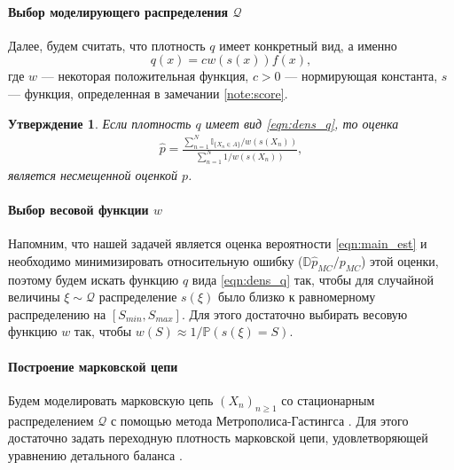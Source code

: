 \documentclass{spisok-article}
\newtheorem{utv}{Утверждение}
\begin{document}
\paragraph{Выбор моделирующего распределения $\mathcal{Q}$}
Далее, будем считать, что плотность $q$ имеет конкретный вид, а именно
\begin{equation}
\label{eqn:dens_q}
q(x) = c w(s(x))f(x),
\end{equation} где $w$ --- некоторая положительная функция, $c > 0$ --- нормирующая константа, $s$ --- функция, определенная в замечании \eqref{note:score}.
\begin{utv}
Если плотность $q$  имеет вид \eqref{eqn:dens_q}, то оценка
\begin{gather}
\label{eqn:main_est}
\widehat{p} = \frac{\sum\limits_{n = 1}^{N} \mathbb{I}_{\{X_n \in A\}}/w(s(X_n))} {\sum\limits_{n = 1}^{N} 1/w(s(X_n))}, 
\end{gather}
является несмещенной оценкой $p$.
\end{utv}


\paragraph{Выбор весовой функции $w$}
Напомним, что нашей задачей является оценка вероятности \eqref{eqn:main_est} и необходимо минимизировать относительную ошибку ($\mathbb{D}\widehat{p}_{MC}/p_{MC}$) этой оценки, поэтому будем искать функцию $q$ вида \eqref{eqn:dens_q} так, чтобы для случайной величины $\xi \sim \mathcal{Q}$ распределение $s(\xi)$ было близко к равномерному распределению на $[S_{min}, S_{max}]$. Для этого достаточно выбирать весовую функцию $w$ так, чтобы $w(S) \approx 1/\mathbb{P}(s(\xi) = S)$.


\paragraph{Построение марковской цепи}

Будем моделировать марковскую цепь $(X_n)_{n \ge 1}$ со стационарным распределением $\mathcal{Q}$ с помощью метода Метрополиса-Гастингса \cite{MH}. Для этого достаточно задать переходную плотность марковской цепи, удовлетворяющей уравнению детального баланса \cite{MHbalance}.
\end{document}
